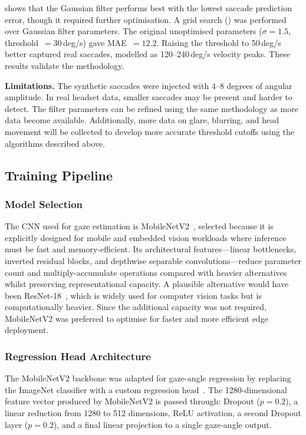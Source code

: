 shows that the Gaussian filter performs best with the lowest saccade prediction error, though it required further optimisation. A grid search () was performed over Gaussian filter parameters. The original unoptimised parameters ($\sigma = 1.5$, threshold~$= 30$\,deg/s) gave MAE~$= 12.2$. Raising the threshold to 50\,deg/s better captured real saccades, modelled as 120--240\,deg/s velocity peaks. These results validate the methodology.

\textbf{Limitations.} The synthetic saccades were injected with 4--8 degrees of angular amplitude. In real headset data, smaller saccades may be present and harder to detect. The filter parameters can be refined using the same methodology as more data become available. Additionally, more data on glare, blurring, and head movement will be collected to develop more accurate threshold cutoffs using the algorithms described above.

\subsection{Training Pipeline}
\label{sec:gaze-training}

\subsubsection{Model Selection}

The CNN used for gaze estimation is MobileNetV2~\cite{sandler2018mobilenetv2}, selected because it is explicitly designed for mobile and embedded vision workloads where inference must be fast and memory-efficient. Its architectural features---linear bottlenecks, inverted residual blocks, and depthwise separable convolutions---reduce parameter count and multiply-accumulate operations compared with heavier alternatives whilst preserving representational capacity. A plausible alternative would have been ResNet-18~\cite{he2016deep}, which is widely used for computer vision tasks but is computationally heavier. Since the additional capacity was not required, MobileNetV2 was preferred to optimise for faster and more efficient edge deployment.

\subsubsection{Regression Head Architecture}

The MobileNetV2 backbone was adapted for gaze-angle regression by replacing the ImageNet classifier with a custom regression head~\cite{sandler2018mobilenetv2}. The 1280-dimensional feature vector produced by MobileNetV2 is passed through: Dropout ($p = 0.2$), a linear reduction from 1280 to 512 dimensions, ReLU activation, a second Dropout layer ($p = 0.2$), and a final linear projection to a single gaze-angle output.


